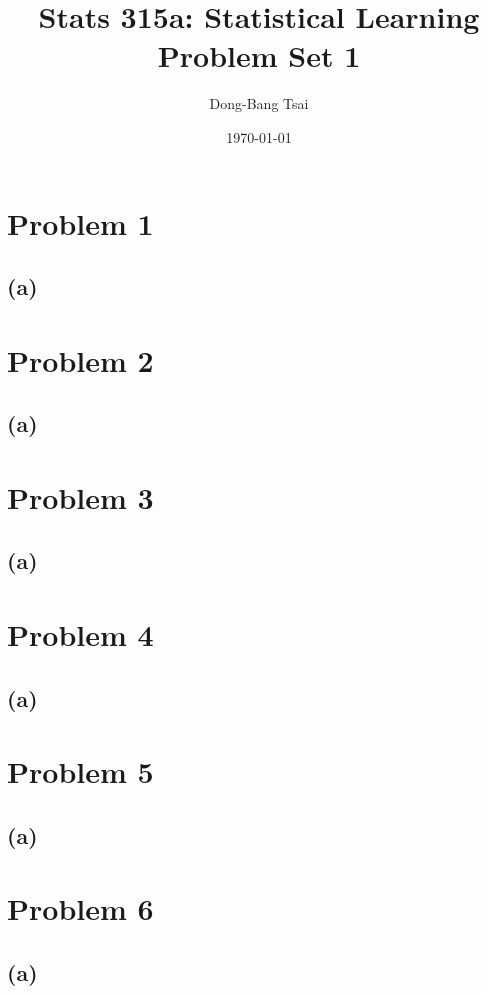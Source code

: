 \documentclass[pra,groupedaddress,amsmath,amssymb, column]{revtex4}
\begin{document}
\title{Stats 315a: Statistical Learning \\ Problem Set 1}
\author{Dong-Bang Tsai}



\date{\today}
\maketitle


\section*{Problem 1}
\subsection*{(a)}


\section*{Problem 2}
\subsection*{(a)}

\section*{Problem 3}
\subsection*{(a)}

\section*{Problem 4}
\subsection*{(a)}

\section*{Problem 5}
\subsection*{(a)}

\section*{Problem 6}
\subsection*{(a)}
\end{document}
